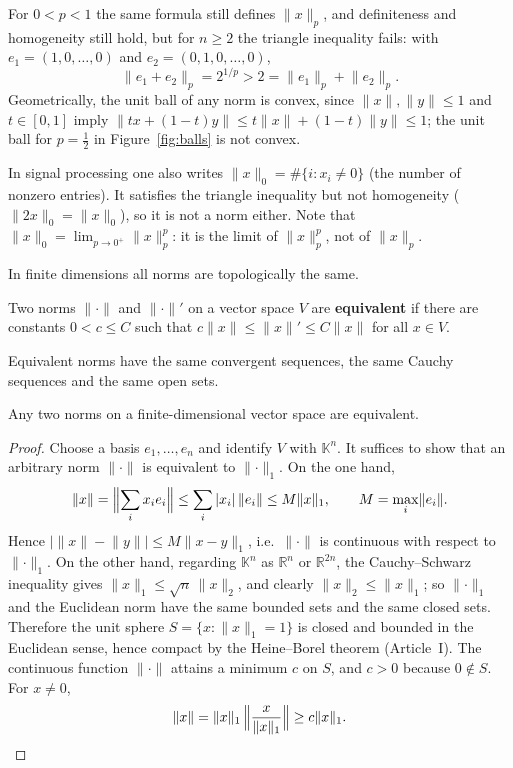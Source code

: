 \documentclass[11pt]{article}
\newcommand{\K}{\mathbb{K}}
\newcommand{\R}{\mathbb{R}}
\newcommand{\norm}[1]{\lVert #1\rVert}
\begin{document}
\begin{example}\label{ex:p-less-1}
For $0<p<1$ the same formula still defines $\norm{x}_{p}$, and definiteness and homogeneity still hold, but for $n\ge2$ the triangle inequality fails: with $e_{1}=(1,0,\dots,0)$ and $e_{2}=(0,1,0,\dots,0)$,
\[
\norm{e_{1}+e_{2}}_{p}=2^{1/p}>2=\norm{e_{1}}_{p}+\norm{e_{2}}_{p}.
\]
Geometrically, the unit ball of any norm is convex, since $\norm{x},\norm{y}\le1$ and $t\in[0,1]$ imply $\norm{tx+(1-t)y}\le t\norm{x}+(1-t)\norm{y}\le1$; the unit ball for $p=\tfrac12$ in Figure~\ref{fig:balls} is not convex.

In signal processing one also writes $\norm{x}_{0}=\#\{i:x_{i}\ne0\}$ (the number of nonzero entries). It satisfies the triangle inequality but not homogeneity ($\norm{2x}_{0}=\norm{x}_{0}$), so it is not a norm either. Note that $\norm{x}_{0}=\lim_{p\to0^{+}}\norm{x}_{p}^{p}$: it is the limit of $\norm{x}_{p}^{p}$, not of $\norm{x}_{p}$.
\end{example}

In finite dimensions all norms are topologically the same.

\begin{definition}
Two norms $\norm{\cdot}$ and $\norm{\cdot}'$ on a vector space $V$ are \textbf{equivalent} if there are constants $0<c\le C$ such that $c\norm{x}\le\norm{x}'\le C\norm{x}$ for all $x\in V$.
\end{definition}

Equivalent norms have the same convergent sequences, the same Cauchy sequences and the same open sets.

\begin{theorem}\label{thm:finite-dim}
Any two norms on a finite-dimensional vector space are equivalent.
\end{theorem}

\begin{proof}
Choose a basis $e_{1},\dots,e_{n}$ and identify $V$ with $\K^{n}$. It suffices to show that an arbitrary norm $\norm{\cdot}$ is equivalent to $\norm{\cdot}_{1}$. On the one hand,
\[
\norm{x}=\Bigl\|\sum_{i}x_{i}e_{i}\Bigr\|\le\sum_{i}|x_{i}|\,\norm{e_{i}}\le M\norm{x}_{1},\qquad M=\max_{i}\norm{e_{i}} .
\]
Hence $\bigl|\norm{x}-\norm{y}\bigr|\le M\norm{x-y}_{1}$, i.e.\ $\norm{\cdot}$ is continuous with respect to $\norm{\cdot}_{1}$. On the other hand, regarding $\K^{n}$ as $\R^{n}$ or $\R^{2n}$, the Cauchy--Schwarz inequality gives $\norm{x}_{1}\le\sqrt{n}\,\norm{x}_{2}$, and clearly $\norm{x}_{2}\le\norm{x}_{1}$; so $\norm{\cdot}_{1}$ and the Euclidean norm have the same bounded sets and the same closed sets. Therefore the unit sphere $S=\{x:\norm{x}_{1}=1\}$ is closed and bounded in the Euclidean sense, hence compact by the Heine--Borel theorem (Article~I). The continuous function $\norm{\cdot}$ attains a minimum $c$ on $S$, and $c>0$ because $0\notin S$. For $x\ne0$,
\[
\norm{x}=\norm{x}_{1}\,\Bigl\|\frac{x}{\norm{x}_{1}}\Bigr\|\ge c\norm{x}_{1}. \qedhere
\]
\end{proof}
\end{document}
